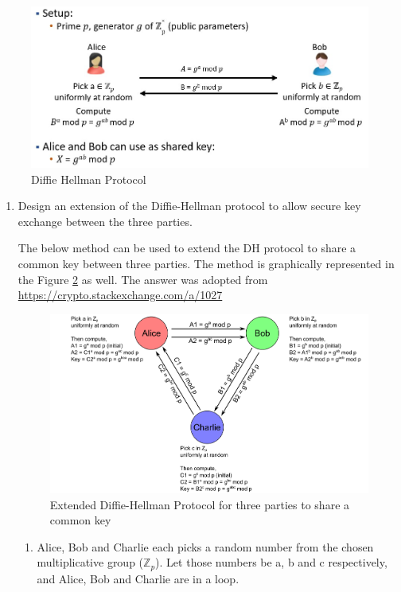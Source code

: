 \documentclass[11pt,letterpaper]{article}
\newenvironment{answer}{\em \color{blue} \begin{adjustwidth}{1cm}{1cm}}{\end{adjustwidth}}
\begin{document}
	\begin{figure}[h]
		\centering
		\includegraphics[width=0.7\columnwidth]{images/dh-protocol.jpg}
		\caption{Diffie Hellman Protocol} \label{fig:dh-protocol}
	\end{figure}
	\begin{enumerate}
		\item Design an extension of the Diffie-Hellman protocol to allow secure key exchange between the three parties.\\
		
		\begin{answer}
			
			The below method can be used to extend the DH protocol to share a common key between three parties. The method is graphically represented in the Figure \ref{fig:dh-protocol-extension} as well. The answer was adopted from \url{https://crypto.stackexchange.com/a/1027}
			
			\begin{figure}[H]
				\centering
				\includegraphics[width=0.7\columnwidth]{images/3-parties-1-key.png}
				\caption{Extended Diffie-Hellman Protocol for three parties to share a common key} \label{fig:dh-protocol-extension}
			\end{figure}
		
		\begin{enumerate}
			\item Alice, Bob and Charlie each picks a random number from the chosen multiplicative group ($\mathbb{Z}_p$). Let those numbers be a, b and c respectively, and Alice, Bob and Charlie are in a loop.
			

\end{enumerate}
\end{answer}
\end{enumerate}
\end{document}
